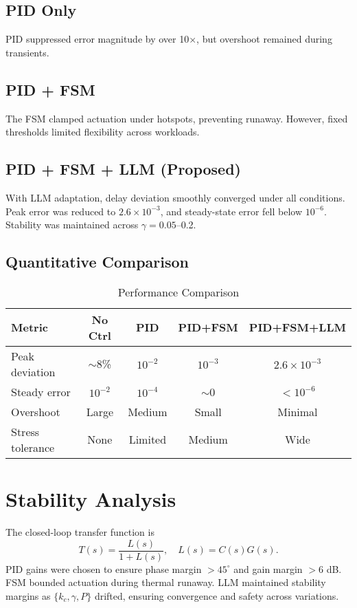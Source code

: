\documentclass[conference]{IEEEtran}
\begin{document}
\subsection{PID Only}
PID suppressed error magnitude by over 10$\times$, but overshoot remained during transients.  

\subsection{PID + FSM}
The FSM clamped actuation under hotspots, preventing runaway. However, fixed thresholds limited flexibility across workloads.  

\subsection{PID + FSM + LLM (Proposed)}
With LLM adaptation, delay deviation smoothly converged under all conditions. Peak error was reduced to $2.6 \times 10^{-3}$, and steady-state error fell below $10^{-6}$. Stability was maintained across $\gamma=0.05$--0.2.  

\subsection{Quantitative Comparison}
\begin{table}[h]
\renewcommand{\arraystretch}{1.1}
\caption{Performance Comparison}
\centering
\begin{tabular}{|l|c|c|c|c|}
\hline
Metric & No Ctrl & PID & PID+FSM & PID+FSM+LLM \\
\hline
Peak deviation & $\sim$8\% & $10^{-2}$ & $10^{-3}$ & $2.6\times 10^{-3}$ \\
Steady error   & $10^{-2}$ & $10^{-4}$ & $\sim$0 & $<10^{-6}$ \\
Overshoot      & Large     & Medium    & Small   & Minimal \\
Stress tolerance & None    & Limited   & Medium  & Wide \\
\hline
\end{tabular}
\end{table}

\section{Stability Analysis}
The closed-loop transfer function is
\[
T(s) = \frac{L(s)}{1+L(s)}, \quad L(s)=C(s)G(s).
\]
PID gains were chosen to ensure phase margin $>45^\circ$ and gain margin $>6$ dB. FSM bounded actuation during thermal runaway. LLM maintained stability margins as $\{k_c,\gamma,P\}$ drifted, ensuring convergence and safety across variations.
\end{document}

